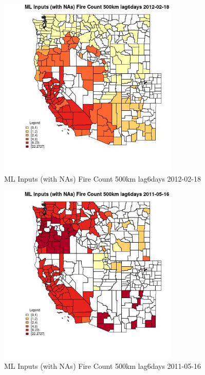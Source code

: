 \begin{figure} 
\centering  
\includegraphics[width=0.77\textwidth]{Code_Outputs/Report_ML_input_PM25_Step4_part_f_de_duplicated_aveswNAs_CountyFire_Count_500km_lag6daysMean2012-02-18.jpg} 
\caption{\label{fig:Report_ML_input_PM25_Step4_part_f_de_duplicated_aveswNAsCountyFire_Count_500km_lag6daysMean2012-02-18}ML Inputs (with NAs) Fire Count 500km lag6days 2012-02-18} 
\end{figure} 
 

\begin{figure} 
\centering  
\includegraphics[width=0.77\textwidth]{Code_Outputs/Report_ML_input_PM25_Step4_part_f_de_duplicated_aveswNAs_CountyFire_Count_500km_lag6daysMean2011-05-16.jpg} 
\caption{\label{fig:Report_ML_input_PM25_Step4_part_f_de_duplicated_aveswNAsCountyFire_Count_500km_lag6daysMean2011-05-16}ML Inputs (with NAs) Fire Count 500km lag6days 2011-05-16} 
\end{figure} 
 

